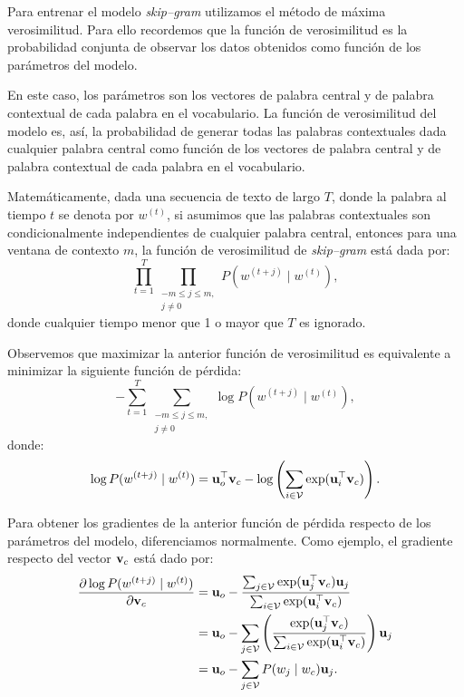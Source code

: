 \documentclass[12pt]{article}
\newcommand{\ce}{\bm{\textbf v}}
\newcommand{\co}{\bm{\textbf u}}
\begin{document}
Para entrenar el modelo \textit{skip--gram} utilizamos el método de máxima verosimilitud. Para ello recordemos que la función de verosimilitud es la probabilidad conjunta de observar los datos obtenidos como función de los parámetros del modelo. 

En este caso, los parámetros son los vectores de palabra central y de palabra contextual de cada palabra en el vocabulario. La función de verosimilitud del modelo es, así, la probabilidad de generar todas las palabras contextuales dada cualquier palabra central como función de los vectores de palabra central y de palabra contextual de cada palabra en el vocabulario.

Matemáticamente, dada una secuencia de texto de largo $ T $, donde la palabra al tiempo $ t $ se denota por $ w^{(t)} $, si asumimos que las palabras contextuales son condicionalmente independientes de cualquier palabra central, entonces para una ventana de contexto $ m $, la función de verosimilitud de \textit{skip--gram} está dada por:
\begin{equation}
    \prod_{t=1}^{T} \prod_{\substack{-m \leq j \leq m, \\ j\neq 0}} P(w^{(t+j)} \mid w^{(t)}),
\end{equation}
donde cualquier tiempo menor que 1 o mayor que $ T $ es ignorado.

Observemos que maximizar la anterior función de verosimilitud es equivalente a minimizar la siguiente función de pérdida:
\begin{equation}
    -\sum_{t=1}^{T} \sum_{\substack{-m \leq j \leq m, \\ j\neq 0}} \log P(w^{(t+j)} \mid w^{(t)}), \label{eq:skip-gram loss}
\end{equation}
donde:
\begin{equation}
    \log P(w^{(t+j)} \mid w^{(t)}) = \co_o^{\top}\ce_c - \log\left(\sum_{i \in \mathcal{V}}\exp(\co_i^{\top}\ce_c) \right).
\end{equation}

Para obtener los gradientes de la anterior función de pérdida respecto de los parámetros del modelo, diferenciamos normalmente. Como ejemplo, el gradiente respecto del vector $ \ce_c $ está dado por:
\begin{align}
    \frac{\partial \log P(w^{(t+j)} \mid w^{(t)})}{\partial \ce_c} &= \co_o - \frac{\sum_{j \in \mathcal{V}}\exp(\co_j^{\top}\ce_c)\co_j}{\sum_{i \in \mathcal{V}}\exp(\co_i^{\top}\ce_c)} \\
    &= \co_o - \sum_{j \in \mathcal{V}} \left( \frac{\exp(\co_j^{\top}\ce_c)}{\sum_{i \in \mathcal{V}}\exp(\co_i^{\top}\ce_c)} \right)\co_j \\
    &= \co_o - \sum_{j \in \mathcal{V}} P(w_j \mid w_c)\co_j.
\end{align}
\end{document}
